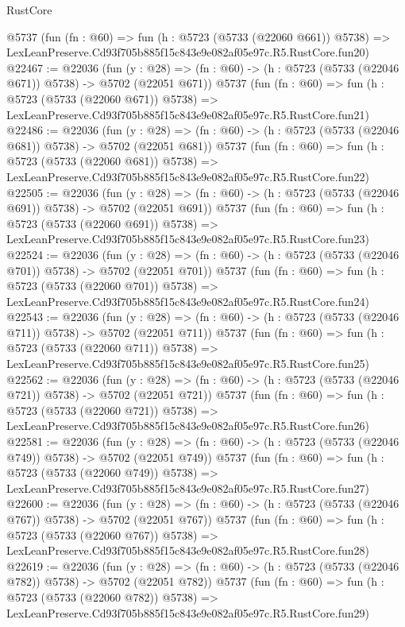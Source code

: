 \begin{lexlean}{RustCore}
\begin{coremodule}
    @5737
    (fun (fn : @60) =>
    fun (h : @5723 (@5733 (@22060 @661)) @5738) =>
    LexLeanPreserve.Cd93f705b885f15c843e9e082af05e97c.R5.RustCore.fun20)
@22467 := @22036
    (fun (y : @28) => (fn : @60) -> (h : @5723 (@5733 (@22046 @671)) @5738) -> @5702 (@22051 @671))
    @5737
    (fun (fn : @60) =>
    fun (h : @5723 (@5733 (@22060 @671)) @5738) =>
    LexLeanPreserve.Cd93f705b885f15c843e9e082af05e97c.R5.RustCore.fun21)
@22486 := @22036
    (fun (y : @28) => (fn : @60) -> (h : @5723 (@5733 (@22046 @681)) @5738) -> @5702 (@22051 @681))
    @5737
    (fun (fn : @60) =>
    fun (h : @5723 (@5733 (@22060 @681)) @5738) =>
    LexLeanPreserve.Cd93f705b885f15c843e9e082af05e97c.R5.RustCore.fun22)
@22505 := @22036
    (fun (y : @28) => (fn : @60) -> (h : @5723 (@5733 (@22046 @691)) @5738) -> @5702 (@22051 @691))
    @5737
    (fun (fn : @60) =>
    fun (h : @5723 (@5733 (@22060 @691)) @5738) =>
    LexLeanPreserve.Cd93f705b885f15c843e9e082af05e97c.R5.RustCore.fun23)
@22524 := @22036
    (fun (y : @28) => (fn : @60) -> (h : @5723 (@5733 (@22046 @701)) @5738) -> @5702 (@22051 @701))
    @5737
    (fun (fn : @60) =>
    fun (h : @5723 (@5733 (@22060 @701)) @5738) =>
    LexLeanPreserve.Cd93f705b885f15c843e9e082af05e97c.R5.RustCore.fun24)
@22543 := @22036
    (fun (y : @28) => (fn : @60) -> (h : @5723 (@5733 (@22046 @711)) @5738) -> @5702 (@22051 @711))
    @5737
    (fun (fn : @60) =>
    fun (h : @5723 (@5733 (@22060 @711)) @5738) =>
    LexLeanPreserve.Cd93f705b885f15c843e9e082af05e97c.R5.RustCore.fun25)
@22562 := @22036
    (fun (y : @28) => (fn : @60) -> (h : @5723 (@5733 (@22046 @721)) @5738) -> @5702 (@22051 @721))
    @5737
    (fun (fn : @60) =>
    fun (h : @5723 (@5733 (@22060 @721)) @5738) =>
    LexLeanPreserve.Cd93f705b885f15c843e9e082af05e97c.R5.RustCore.fun26)
@22581 := @22036
    (fun (y : @28) => (fn : @60) -> (h : @5723 (@5733 (@22046 @749)) @5738) -> @5702 (@22051 @749))
    @5737
    (fun (fn : @60) =>
    fun (h : @5723 (@5733 (@22060 @749)) @5738) =>
    LexLeanPreserve.Cd93f705b885f15c843e9e082af05e97c.R5.RustCore.fun27)
@22600 := @22036
    (fun (y : @28) => (fn : @60) -> (h : @5723 (@5733 (@22046 @767)) @5738) -> @5702 (@22051 @767))
    @5737
    (fun (fn : @60) =>
    fun (h : @5723 (@5733 (@22060 @767)) @5738) =>
    LexLeanPreserve.Cd93f705b885f15c843e9e082af05e97c.R5.RustCore.fun28)
@22619 := @22036
    (fun (y : @28) => (fn : @60) -> (h : @5723 (@5733 (@22046 @782)) @5738) -> @5702 (@22051 @782))
    @5737
    (fun (fn : @60) =>
    fun (h : @5723 (@5733 (@22060 @782)) @5738) =>
    LexLeanPreserve.Cd93f705b885f15c843e9e082af05e97c.R5.RustCore.fun29)

\end{coremodule}
\end{lexlean}
